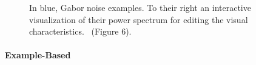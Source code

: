 \begin{figure}[H]
    \centering
    \caption{\label{fig:galerne_2012_gne}In blue, Gabor noise examples. To their right an interactive visualization of their power spectrum for editing the visual characteristics.~\cite{galerne_2012_gne} (Figure 6). \color{orange}{Status rights: requested}}
\end{figure}

\paragraph*{Example-Based}
\label{para:analysis_stochastic_examplebased_control}

